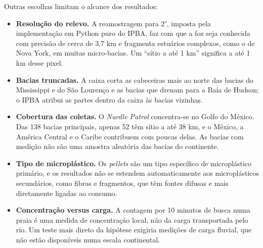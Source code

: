 Outras escolhas limitam o alcance dos resultados:

\begin{itemize}
	\item \textbf{Resolução do relevo.} A reamostragem para 2$'$, imposta pela implementação em Python puro do IPBA, faz com que a foz seja conhecida com precisão de cerca de 3,7 km e fragmenta estuários complexos, como o de Nova York, em muitas micro-bacias. Um ``sítio a até 1 km'' significa a até 1 km desse pixel.
	\item \textbf{Bacias truncadas.} A caixa corta as cabeceiras mais ao norte das bacias do Mississippi e do São Lourenço e as bacias que drenam para a Baía de Hudson; o IPBA atribui as partes dentro da caixa às bacias vizinhas.
	\item \textbf{Cobertura das coletas.} O \textit{Nurdle Patrol} concentra-se no Golfo do México. Das 138 bacias principais, apenas 52 têm sítio a até 38 km, e o México, a América Central e o Caribe contribuem com poucas delas. As bacias com medição não são uma amostra aleatória das bacias do continente.
	\item \textbf{Tipo de microplástico.} Os \textit{pellets} são um tipo específico de microplástico primário, e os resultados não se estendem automaticamente aos microplásticos secundários, como fibras e fragmentos, que têm fontes difusas e mais diretamente ligadas ao consumo.
	\item \textbf{Concentração versus carga.} A contagem por 10 minutos de busca numa praia é uma medida de concentração local, não da carga transportada pelo rio. Um teste mais direto da hipótese exigiria medições de carga fluvial, que não estão disponíveis numa escala continental.
\end{itemize}
